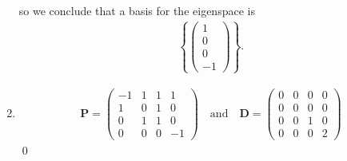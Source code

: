 \documentclass[12pt]{article}
\begin{document}
\begin{enumerate}[label=\textbf{(\alph*)}]
    so we conclude that a basis for the eigenspace is \begin{align*}
        \left\{\begin{pmatrix}
            1 \\0\\0\\-1
        \end{pmatrix}\right\}.
    \end{align*}
    \item \begin{align*}
        \mathbf{P}=\begin{pmatrix}
            -1 & 1 & 1 & 1 \\ 1 & 0 & 1 & 0\\0&1&1&0\\0&0&0&-1
        \end{pmatrix}\quad\text{and}\quad \mathbf{D}=\begin{pmatrix}
            0 & 0 & 0 & 0 \\ 
            0 & 0 & 0 & 0 \\
            0 & 0 & 1 & 0 \\
            0 & 0 & 0 & 2
        \end{pmatrix}
    \end{align*}\qed 
\end{enumerate}
\end{document}
